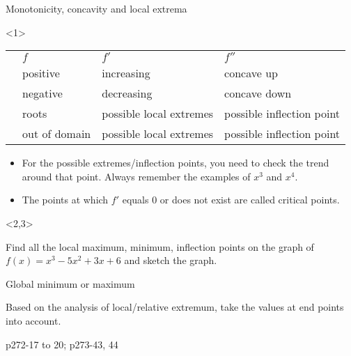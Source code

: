 \begin{frame}{Monotonicity, concavity and local extrema}

\begin{onlyenv}<1>


\begin{center}
\begin{tabular}{|>{\raggedleft}p{}|>{\raggedright}p{}|>{\raggedright}p{}|>{\raggedright}p{}|}
\hline 
 & {\small{}$f$} & {\small{}$f'$} & {\small{}$f''$}\tabularnewline
{\small{}$>0$} & {\small{}positive} & {\small{}increasing} & {\small{}concave up}\tabularnewline
{\small{}$<0$} & {\small{}negative} & {\small{}decreasing} & {\small{}concave down}\tabularnewline
{\small{}$=0$} & {\small{}roots} & {\small{}possible local extremes} & {\small{}possible inflection point}\tabularnewline
{\small{}not exist} & {\small{}out of domain} & {\small{}possible local extremes} & {\small{}possible inflection point}\tabularnewline
\hline 
\end{tabular}
\par\end{center}
\begin{itemize}
\item For the possible extremes/inflection points, you need to check the
trend around that point. Always remember the examples of $x^{3}$
and $x^{4}$.
\item The points at which $f'$ equals $0$ or does not exist are called
\alert{critical points}.
\end{itemize}
\end{onlyenv}



\begin{onlyenv}<2,3>

\begin{example}
Find all the local maximum, minimum, inflection points on the graph
of $f\left(x\right)=x^{3}-5x^{2}+3x+6$ and sketch the graph.
\end{example}
\end{onlyenv}

\end{frame}

\begin{frame}{Global minimum or maximum}

Based on the analysis of local/relative extremum, take the values
at end points into account.
\begin{example}
p272-17 to 20; p273-43, 44
\end{example}

\end{frame}

